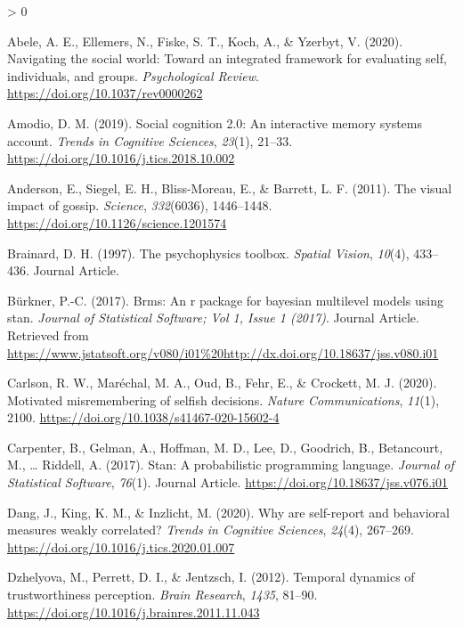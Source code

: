 \documentclass[
  english,
  man]{apa6}
\newlength{\cslhangindent}
\newenvironment{CSLReferences}[2] %
 {%
  \setlength{\parindent}{0pt}
  \ifodd #1 \everypar{\setlength{\hangindent}{\cslhangindent}}\ignorespaces\fi
  \ifnum #2 > 0
  \setlength{\parskip}{#2\baselineskip}
  \fi
 }%
 {}
\begin{document}
\hypertarget{refs}{}
\begin{CSLReferences}{1}{0}
\leavevmode\hypertarget{ref-abele_navigating_2020}{}%
Abele, A. E., Ellemers, N., Fiske, S. T., Koch, A., \& Yzerbyt, V. (2020). Navigating the social world: Toward an integrated framework for evaluating self, individuals, and groups. \emph{Psychological Review}. \url{https://doi.org/10.1037/rev0000262}

\leavevmode\hypertarget{ref-amodio_social_2019}{}%
Amodio, D. M. (2019). Social cognition 2.0: An interactive memory systems account. \emph{Trends in Cognitive Sciences}, \emph{23}(1), 21--33. \url{https://doi.org/10.1016/j.tics.2018.10.002}

\leavevmode\hypertarget{ref-anderson_visual_2011}{}%
Anderson, E., Siegel, E. H., Bliss-Moreau, E., \& Barrett, L. F. (2011). The visual impact of gossip. \emph{Science}, \emph{332}(6036), 1446--1448. \url{https://doi.org/10.1126/science.1201574}

\leavevmode\hypertarget{ref-Brainard_1997}{}%
Brainard, D. H. (1997). The psychophysics toolbox. \emph{Spatial Vision}, \emph{10}(4), 433--436. Journal Article.

\leavevmode\hypertarget{ref-Buxfcrkner_2017}{}%
Bürkner, P.-C. (2017). Brms: An r package for bayesian multilevel models using stan. \emph{Journal of Statistical Software; Vol 1, Issue 1 (2017)}. Journal Article. Retrieved from \url{https://www.jstatsoft.org/v080/i01\%20http://dx.doi.org/10.18637/jss.v080.i01}

\leavevmode\hypertarget{ref-carlson_motivated_2020}{}%
Carlson, R. W., Maréchal, M. A., Oud, B., Fehr, E., \& Crockett, M. J. (2020). Motivated misremembering of selfish decisions. \emph{Nature Communications}, \emph{11}(1), 2100. \url{https://doi.org/10.1038/s41467-020-15602-4}

\leavevmode\hypertarget{ref-Carpenter_2017_stan}{}%
Carpenter, B., Gelman, A., Hoffman, M. D., Lee, D., Goodrich, B., Betancourt, M., \ldots{} Riddell, A. (2017). Stan: A probabilistic programming language. \emph{Journal of Statistical Software}, \emph{76}(1). Journal Article. \url{https://doi.org/10.18637/jss.v076.i01}

\leavevmode\hypertarget{ref-dang_why_2020}{}%
Dang, J., King, K. M., \& Inzlicht, M. (2020). Why are self-report and behavioral measures weakly correlated? \emph{Trends in Cognitive Sciences}, \emph{24}(4), 267--269. \url{https://doi.org/10.1016/j.tics.2020.01.007}

\leavevmode\hypertarget{ref-dzhelyova_temporal_2012}{}%
Dzhelyova, M., Perrett, D. I., \& Jentzsch, I. (2012). Temporal dynamics of trustworthiness perception. \emph{Brain Research}, \emph{1435}, 81--90. \url{https://doi.org/10.1016/j.brainres.2011.11.043}


\end{CSLReferences}
\end{document}
